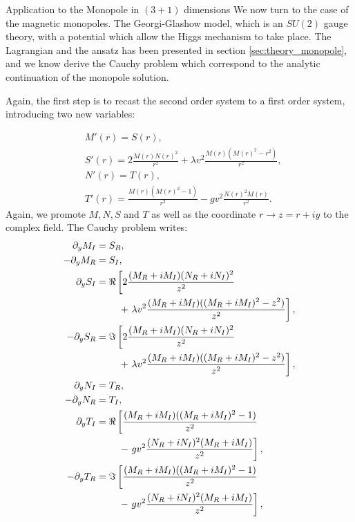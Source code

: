 \begin{section}{Application to the Monopole in $(3+1)$ dimensions}
  We now turn to the case of the magnetic monopoles. The
  Georgi-Glashow model, which is an $SU(2)$ gauge theory, with a
  potential which allow the Higgs mechanism to take place.  The
  Lagrangian and the ansatz has been presented in section
  \ref{sec:theory_monopole}, and we know derive the Cauchy problem
  which correspond to the analytic continuation of the monopole
  solution.
  
  Again, the first step is to recast the second order system to a
  first order system, introducing two new variables:
  
  \begin{align}
    &M'(r) = S(r),\\
    &S'(r) = 2\frac{M(r)N(r)^2}{r^2}+\lambda v^2\frac{M(r)(M(r)^2-r^2)}{r^2},\\
    &N'(r) = T(r),\\
    &T'(r) = \frac{M(r)(M(r)^2-1)}{r^2}-gv^2\frac{N(r)^2M(r)}{r^2}.
  \end{align}
  Again, we promote $M,N,S$ and $T$ as well as the coordinate $r\to
  z=r+iy$ to the complex field. The Cauchy problem writes:
  \begin{align}
    \partial_y M_I &= S_R,\\
    -\partial_y M_R &= S_I,\\
    \partial_y S_I &= \Re\left[2\frac{(M_R+iM_I)(N_R+iN_I)^2}{z^2}\right.\\
      &\hphantom{= \Re\left[\right.}+\left.\lambda v^2 \frac{(M_R+iM_I)((M_R+iM_I)^2-z^2)}{z^2}\right],\\
      -\partial_y S_R &= \Im\left[2\frac{(M_R+iM_I)(N_R+iN_I)^2}{z^2}\right.\\
        &\hphantom{= \Re\left[\right.}+\left.\lambda v^2 \frac{(M_R+iM_I)((M_R+iM_I)^2-z^2)}{z^2}\right],\\
        \partial_y N_I &= T_R,\\
        -\partial_y N_R &= T_I,\\
        \partial_y T_I &= \Re\left[\frac{(M_R+iM_I)((M_R+iM_I)^2-1)}{z^2}\right.\\
          &\hphantom{=\Re\left[\right.}-\left.gv^2\frac{(N_R+iN_I)^2(M_R+iM_I)}{z^2}\right],\\
          -\partial_y T_R &= \Im\left[\frac{(M_R+iM_I)((M_R+iM_I)^2-1)}{z^2}\right.\\
      &\hphantom{=\Re\left[\right.}-\left.gv^2\frac{(N_R+iN_I)^2(M_R+iM_I)}{z^2}\right],
  \end{align}

\end{section}

